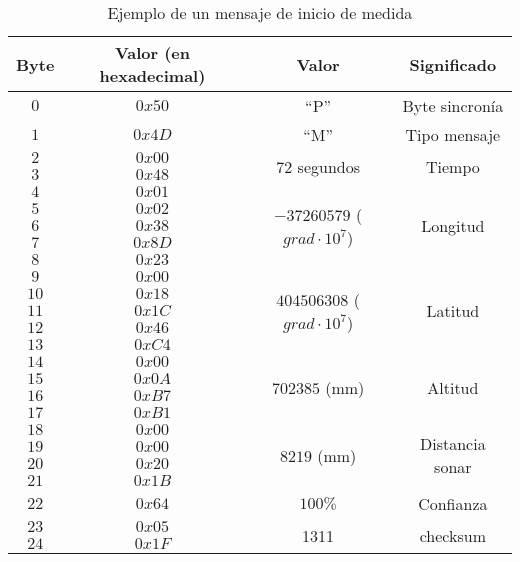 \begin{table}
	\centering
	\caption{Ejemplo de un mensaje de inicio de medida}
	\begin{tabular}{|c|c|c|c|}\hline
		\textbf{Byte} 	&	\textbf{Valor (en hexadecimal)}	&\textbf{Valor}	&\textbf{Significado} \\ \hline \hline
		$0$ 			&  $0x50$			& ``P''	& Byte sincronía	\\ \hline
		$1$				&  $0x4D$			& ``M''	& Tipo mensaje		\\ \hline
		$2$				&  $0x00$			& \multirow{2}{*}{$72$ segundos} & \multirow{2}{*}{Tiempo} \\
		$3$				&  $0x48$			&  & \\ \hline	
		$4$				&  $0x01$			&  \multirow{5}{*}{$-37260579$ ($grad \cdot 10^{7}$) } &  \multirow{5}{*}{Longitud}  \\
		$5$				&  $0x02$			&  &   \\ 	
		$6$				&  $0x38$			&  &    \\ 	
		$7$				&  $0x8D$			&  &    \\ 	
		$8$				&  $0x23$			&   &   \\ \hline
		$9$				&  $0x00$			& \multirow{5}{*}{$404506308$ ($grad \cdot 10^{7}$) } &  \multirow{5}{*}{Latitud}   \\
		$10$				&  $0x18$			&  &     \\ 	
		$11$				&  $0x1C$			&  &      \\ 	
		$12$				&  $0x46$			&  &      \\ 	
		$13$				&  $0xC4$			&  &      \\ \hline
		$14$				&  $0x00$			& \multirow{4}{*}{$702385$ (mm) } & \multirow{4}{*}{Altitud}\\
		$15$				&  $0x0A$			&   &     \\ 	
		$16$				&  $0xB7$			&   &         \\ 	
		$17$				&  $0xB1$			&   &        \\ \hline
		$18$				&  $0x00$			& \multirow{4}{*}{$8219$ (mm) } & \multirow{4}{*}{Distancia sonar}\\
		$19$				&  $0x00$			&     &     \\ 	
		$20$				&  $0x20$			&     &     \\ 	
		$21$				&  $0x1B$			&     &     \\ 	\hline
		$22$				&  $0x64$			& $100 \%$ &     Confianza \\ \hline
		$23$				&  $0x05$			&  \multirow{2}{*}{1311}	& \multirow{2}{*}{checksum} \\
		$24$				&  $0x1F$			&     &     \\ \hline	
		
		
	\end{tabular}
	\label{tab:5}
\end{table}

